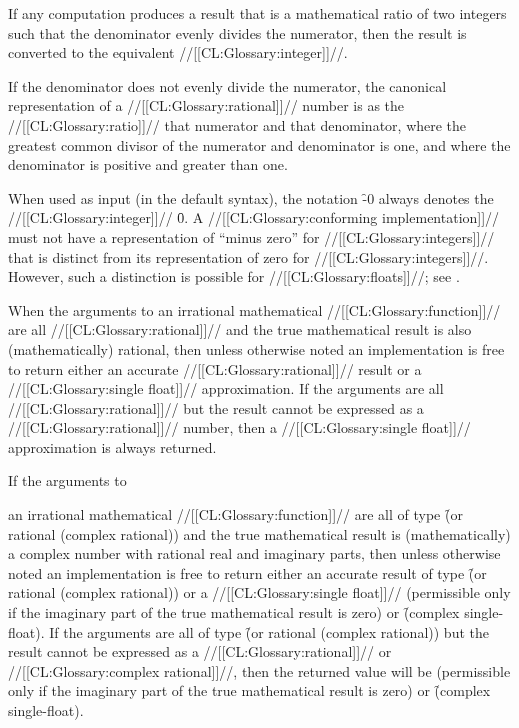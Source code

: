 If any computation produces a result that is a mathematical ratio of two integers
such that the denominator evenly divides the numerator, then the result is converted
to the equivalent //[[CL:Glossary:integer]]//.  




If the denominator does not evenly divide the numerator,
the canonical representation of a //[[CL:Glossary:rational]]// number is as the //[[CL:Glossary:ratio]]//
that numerator and that denominator, where the greatest common divisor of
the numerator and denominator is one, and where the denominator is positive
and greater than one.

When used as input (in the default syntax),
the notation \f{-0} always denotes the //[[CL:Glossary:integer]]// \f{0}.
A //[[CL:Glossary:conforming implementation]]// must not have a
representation of ``minus zero'' for //[[CL:Glossary:integers]]//
that is distinct from its representation of zero for //[[CL:Glossary:integers]]//.
However, such a distinction is possible for //[[CL:Glossary:floats]]//; 
see .

\endsubsubsection%



When the arguments to an irrational mathematical //[[CL:Glossary:function]]// 
are all //[[CL:Glossary:rational]]// and the true mathematical result
is also (mathematically) rational, then unless otherwise noted
an implementation is free to return either an accurate
//[[CL:Glossary:rational]]// result
or a //[[CL:Glossary:single float]]// approximation.
If the arguments are all //[[CL:Glossary:rational]]// 
but the result cannot be expressed
as a //[[CL:Glossary:rational]]// number, then a //[[CL:Glossary:single float]]// 
approximation is always returned.

If the arguments to 



an irrational
mathematical //[[CL:Glossary:function]]// are all of type
  \f{(or rational (complex rational))} 
and the true mathematical result is
  (mathematically) a complex number with rational real and imaginary
  parts, then unless otherwise noted an implementation is free to return
  either an accurate result of type \f{(or rational (complex rational))} 
or
  a //[[CL:Glossary:single float]]//
  (permissible only if the imaginary part of the true mathematical
  result is zero) or \f{(complex single-float)}. If the arguments are
  all of type \f{(or rational (complex rational))}
but the result cannot be
  expressed as a //[[CL:Glossary:rational]]// or //[[CL:Glossary:complex rational]]//,
then the returned
  value will be  
(permissible only if the imaginary
  part of the true mathematical result is zero) or \f{(complex single-float)}.

